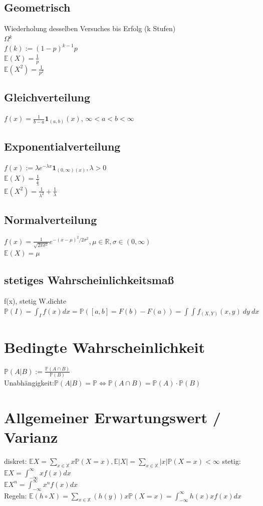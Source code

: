 \documentclass[]{article}
\begin{document}
\subsection{Geometrisch}
Wiederholung desselben Versuches bis Erfolg (k Stufen)\\
$\Omega$$^k$\\
$f(k):=(1-p)^{k-1}p$\\
$\mathbb{E}(X)=\frac{1}{p}$\\
$\mathbb{E}(X^2)=\frac{1}{p^2}$
\subsection{Gleichverteilung}$f(x)=\frac{1}{b-a}\mathbf{1}_{(a,b)}(x)$, $ \infty <a<b<\infty$
\subsection{Exponentialverteilung}
$f(x):=\lambda e^{-\lambda x} \mathbf{1}_{(0,\infty)(x)}, \lambda >0$\\
$\mathbb{E}(X)=\frac{1}{\frac{1}{\lambda}}$\\
$\mathbb{E}(X^2)=\frac{1}{\lambda^2}+\frac{1}{\lambda}$
\subsection{Normalverteilung}
$f(x)=\frac{1}{ \sqrt{2 \pi \sigma^2} } e^{-(x-\mu)^2 /2\sigma^2}, \mu \in \mathbb{R}, \sigma \in(0,\infty)$\\
$\mathbb{E}(X)=\mu$
\subsection{stetiges Wahrscheinlichkeitsmaß}
f(x), stetig W.dichte
$\mathbb{P}(I)=\int_I f(x)dx=\mathbb{P}([a,b]=F(b)-F(a)) =\int \int f_{(X,Y)}(x,y)\ dy\ dx$
\section{Bedingte Wahrscheinlichkeit}
$\mathbb{P}(A|B):=\frac{\mathbb{P}(A\cap B)}{\mathbb{P}(B)}$\\
Unabhängigkeit:$\mathbb{P}(A|B)=\mathbb{P} \Leftrightarrow \mathbb{P}(A \cap B)=\mathbb{P}(A) \cdot \mathbb{P}(B)$ 
\section{Allgemeiner Erwartungswert / Varianz }
diskret: $\mathbb{E}X =\sum_{x \in \mathbb{X}} x \mathbb{P}(X=x), \mathbb{E}|X|=\sum_{x \in \mathbb{X}} |x| \mathbb{P}(X=x) <\infty   $
stetig: $\mathbb{E}X =\int_{-\infty}^{\infty} x f(x) dx $\\ $\mathbb{E}X^n =\int_{-\infty}^{\infty} x^n f(x) dx $\\
Regeln:
$\mathbb{E}(h \circ X) =\sum_{x \in \mathbb{X}} (h(y)) x \mathbb{P}(X=x) =\int_{-\infty}^{\infty} h(x) x f(x) dx $
\end{document}

